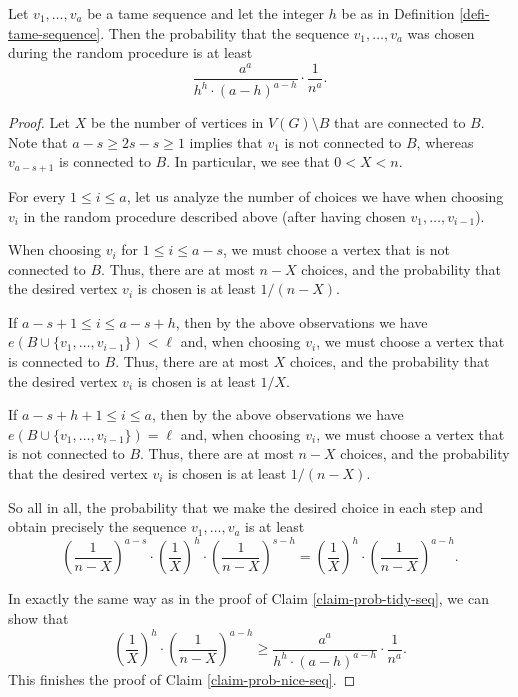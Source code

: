 \begin{claim}\label{claim-prob-nice-seq} Let $v_1,\dots,v_a$ be a tame sequence and let the integer $h$ be as in Definition \ref{defi-tame-sequence}. Then the probability that the sequence $v_1,\dots,v_a$ was chosen during the random procedure is at least
\[\frac{a^a}{h^h\cdot (a-h)^{a-h}}\cdot \frac{1}{n^a}.\]
\end{claim}
\begin{proof}
Let $X$ be the number of vertices in $V(G)\setminus B$ that are connected to $B$. Note that $a-s\geq 2s-s\geq 1$ implies that $v_1$ is not connected to $B$, whereas  $v_{a-s+1}$ is connected to $B$. In particular, we see that $0<X<n$.

For every $1\leq i\leq a$, let us analyze the number of choices we have when choosing $v_i$ in the random procedure described above (after having chosen $v_1,\dots,v_{i-1}$).

When choosing $v_i$ for $1\leq i\leq a-s$, we must choose a vertex that is not connected to $B$. Thus, there are at most $n-X$ choices, and the probability that the desired vertex $v_i$ is chosen is at least $1/(n-X)$.

If $a-s+1\leq i\leq a-s+h$, then by the above observations we have $e(B\cup \lbrace v_1,\dots,v_{i-1}\rbrace)<\ell$ and, when choosing $v_i$, we must choose a vertex that is connected to $B$. Thus, there are at most $X$ choices, and the probability that the desired vertex $v_i$ is chosen is at least $1/X$.

If $a-s+ h+1\leq i\leq a$, then by the above observations we have $e(B\cup \lbrace v_1,\dots,v_{i-1}\rbrace)=\ell$ and, when choosing $v_i$, we must choose a vertex that is not connected to $B$. Thus, there are at most $n-X$ choices, and the probability that the desired vertex $v_i$ is chosen is at least $1/(n-X)$.

So all in all, the probability that we make the desired choice in each step and obtain precisely the sequence $v_1,\dots,v_a$ is at least
\[\left(\frac{1}{n-X}\right)^{a-s}\cdot \left(\frac{1}{X}\right)^h\cdot \left(\frac{1}{n-X}\right)^{s-h}=\left(\frac{1}{X}\right)^h\cdot \left(\frac{1}{n-X}\right)^{a-h}.\]

In exactly the same way as in the proof of Claim \ref{claim-prob-tidy-seq}, we can show that
\[\left(\frac{1}{X}\right)^h\cdot \left(\frac{1}{n-X}\right)^{a-h}\geq \frac{a^a}{h^h\cdot (a-h)^{a-h}}\cdot \frac{1}{n^a}.\]
This finishes the proof of Claim \ref{claim-prob-nice-seq}.
\end{proof}

